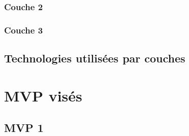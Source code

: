 \documentclass[a4paper,12pt]{report}
\begin{document}
\subsection{Couche 2}

\subsection{Couche 3}

\section{Technologies utilisées par couches}

\chapter{MVP visés}

\section{MVP 1}
\end{document}
